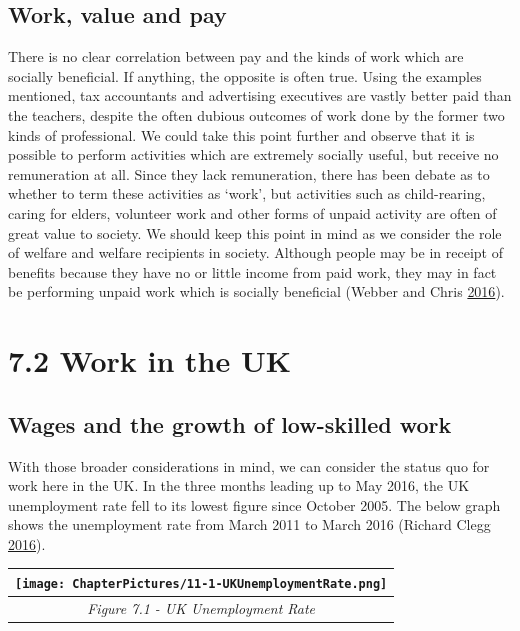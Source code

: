 \documentclass[]{tufte-handout}
\begin{document}
\hypertarget{work-value-and-pay}{%
\subsection{Work, value and pay}\label{work-value-and-pay}}

There is no clear correlation between pay and the kinds of work which
are socially beneficial. If anything, the opposite is often true. Using
the examples mentioned, tax accountants and advertising executives are
vastly better paid than the teachers, despite the often dubious outcomes
of work done by the former two kinds of professional. We could take this
point further and observe that it is possible to perform activities
which are extremely socially useful, but receive no remuneration at all.
Since they lack remuneration, there has been debate as to whether to
term these activities as `work', but activities such as child-rearing,
caring for elders, volunteer work and other forms of unpaid activity are
often of great value to society. We should keep this point in mind as we
consider the role of welfare and welfare recipients in society. Although
people may be in receipt of benefits because they have no or little
income from paid work, they may in fact be performing unpaid work which
is socially beneficial (Webber and Chris
\protect\hyperlink{ref-Webber2016}{2016}).

\hypertarget{work-in-the-uk}{%
\section{7.2 Work in the UK}\label{work-in-the-uk}}

\hypertarget{wages-and-the-growth-of-low-skilled-work}{%
\subsection{Wages and the growth of low-skilled
work}\label{wages-and-the-growth-of-low-skilled-work}}

With those broader considerations in mind, we can consider the status
quo for work here in the UK. In the three months leading up to May 2016,
the UK unemployment rate fell to its lowest figure since October 2005.
The below graph shows the unemployment rate from March 2011 to March
2016 (Richard Clegg \protect\hyperlink{ref-RichardClegg2016}{2016}).

\begin{longtable}[]{@{}c@{}}
\toprule
\texttt{[image: ChapterPictures/11-1-UKUnemploymentRate.png]}\tabularnewline
\midrule
\endhead
\emph{Figure 7.1 - UK Unemployment Rate}\tabularnewline
\bottomrule
\end{longtable}
\end{document}
